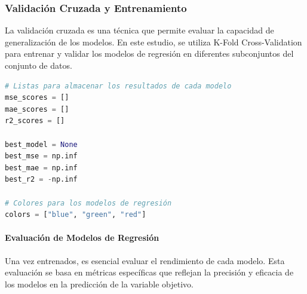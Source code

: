 \subsubsection{Validación Cruzada y Entrenamiento}
La validación cruzada es una técnica que permite evaluar la capacidad de generalización de los modelos. En este estudio, se utiliza K-Fold Cross-Validation para entrenar y validar los modelos de regresión en diferentes subconjuntos del conjunto de datos.

\begin{lstlisting}[language=Python, caption=Configuraicones previas antes de la evaluación, label=lst:config_preEval]
# Listas para almacenar los resultados de cada modelo
mse_scores = []
mae_scores = []
r2_scores = []

best_model = None
best_mse = np.inf
best_mae = np.inf
best_r2 = -np.inf

# Colores para los modelos de regresión
colors = ["blue", "green", "red"]
    \end{lstlisting}

\paragraph{Evaluación de Modelos de Regresión}
Una vez entrenados, es esencial evaluar el rendimiento de cada modelo. Esta evaluación se basa en métricas específicas que reflejan la precisión y eficacia de los modelos en la predicción de la variable objetivo.

